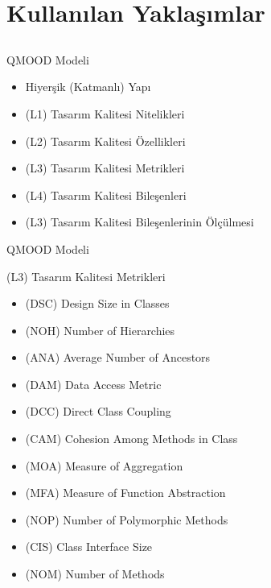 \documentclass[compress,xcolor=table]{beamer}
\begin{document}
        \section{Kullanılan Yaklaşımlar} \subsection{}
        \begin{frame}{QMOOD Modeli}
\begin{block}{}
		
\begin{itemize}
\item Hiyerşik (Katmanlı) Yapı
\item (L1) Tasarım Kalitesi Nitelikleri
\item (L2) Tasarım Kalitesi Özellikleri
\item (L3) Tasarım Kalitesi Metrikleri
\item (L4) Tasarım Kalitesi Bileşenleri
\item (L3) Tasarım Kalitesi Bileşenlerinin Ölçülmesi
\end{itemize}
		
\end{block}
\end{frame}

\begin{frame}{QMOOD Modeli}
\begin{block}{(L3) Tasarım Kalitesi Metrikleri}
		
\begin{itemize}
\item (DSC) Design Size in Classes
\item (NOH) Number of Hierarchies
\item (ANA) Average Number of Ancestors
\item  (DAM) Data Access Metric
\item  (DCC) Direct Class Coupling
\item (CAM) Cohesion Among Methods in Class
\item  (MOA) Measure of Aggregation
\item  (MFA) Measure of Function Abstraction
\item (NOP) Number of Polymorphic Methods
\item  (CIS) Class Interface Size
\item  (NOM) Number of Methods



\end{itemize}

		
\end{block}
\end{frame}
\end{document}
